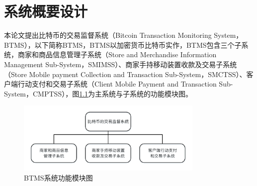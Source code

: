 \chapter{系统概要设计} 


	本论文提出比特币的交易监督系统（Bitcoin Transaction Monitoring System，BTMS）\supercite{Blockchain-basedpaymentcollectionsupervisionsystemusingpervasiveBitcoindigitalwallet}，以下简称BTMS，BTMS以加密货币比特币实作，BTMS包含三个子系统，商家和商品信息管理子系统（Store and Merchandise Information Management Sub-System，SMIMSS）、商家手持移动装置收款及交易子系统（Store Mobile payment Collection and Transaction Sub-System，SMCTSS）、客户端行动支付和交易子系统（Client Mobile Payment and Transaction Sub-System，CMPTSS），图\ref{model0}为主系统与子系统的功能模块图。

	\begin{figure}[!htbp]
		\centering
		\includegraphics[width = 0.8\textwidth]{model0.pdf}
		\caption{BTMS系统功能模块图}\label{model0}
	\end{figure}

